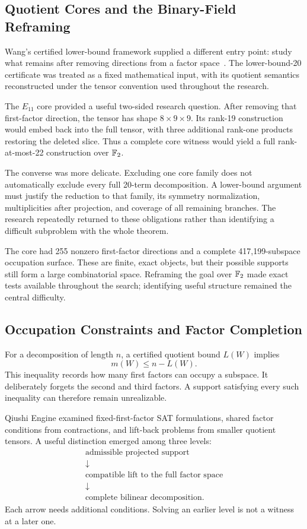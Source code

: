 \subsection{Quotient Cores and the Binary-Field Reframing}\label{route:cores}

Wang's certified lower-bound framework supplied a different entry point:
study what remains after removing directions from a factor
space~\cite{wangautomated}. The lower-bound-20 certificate was treated
as a fixed mathematical input, with its quotient semantics reconstructed
under the tensor convention used throughout the research.

The $E_{11}$ core provided a useful two-sided research question.
After removing that first-factor direction, the tensor has shape
$8\times9\times9$. Its rank-19 construction would embed back into the
full tensor, with three additional rank-one products restoring the
deleted slice. Thus a complete core witness would yield a full
rank-at-most-22 construction over $\mathbb{F}_2$.

The converse was more delicate. Excluding one core family does not
automatically exclude every full 20-term decomposition. A lower-bound
argument must justify the reduction to that family, its symmetry
normalization, multiplicities after projection, and coverage of all
remaining branches. The research repeatedly returned to these
obligations rather than identifying a difficult subproblem with the
whole theorem.

The core had 255 nonzero first-factor directions and a complete
417,199-subspace occupation surface. These are finite, exact objects,
but their possible supports still form a large combinatorial space.
Reframing the goal over $\mathbb{F}_2$ made exact tests available throughout
the search; identifying useful structure remained the central difficulty.

\subsection{Occupation Constraints and Factor Completion}\label{route:completion}

For a decomposition of length $n$, a certified quotient bound $L(W)$
implies
\[
 m(W)\le n-L(W).
\]
This inequality records how many first factors can occupy a subspace.
It deliberately forgets the second and third factors. A support
satisfying every such inequality can therefore remain unrealizable.

Qiushi Engine examined fixed-first-factor SAT formulations, shared
factor conditions from contractions, and lift-back problems from
smaller quotient tensors. A useful distinction emerged among three
levels:
\[
 \begin{gathered}
 \text{admissible projected support}\\
 \downarrow\\
 \text{compatible lift to the full factor space}\\
 \downarrow\\
 \text{complete bilinear decomposition}.
 \end{gathered}
\]
Each arrow needs additional conditions. Solving an earlier level is
not a witness at a later one.


